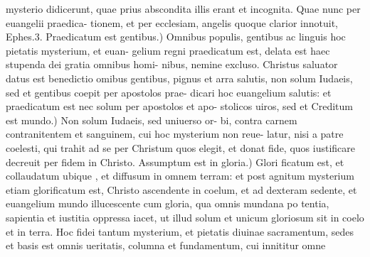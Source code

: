 \documentclass{article}
\begin{document}
\begin{pages}
mysterio didicerunt, quae prius abscondita illis erant et incognita. Quae nunc per euangelii praedica- tionem, et per ecclesiam, angelis quoque clarior innotuit, Ephes.3. Praedicatum est gentibus.) Omnibus populis, gentibus ac linguis hoc pietatis mysterium, et euan- gelium regni praedicatum est, delata est haec stupenda dei gratia omnibus homi- nibus, nemine excluso. Christus saluator datus est benedictio omibus gentibus, pignus et arra salutis, non solum Iudaeis, sed et gentibus coepit per apostolos prae- dicari hoc euangelium salutis: et praedicatum est nec solum per apostolos et apo- stolicos uiros, sed et Creditum est mundo.) Non solum Iudaeis, sed uniuerso or- bi, contra carnem contranitentem et sanguinem, cui hoc mysterium non reue- latur, nisi a patre coelesti, qui trahit ad se per Christum quos elegit, et donat fide, quos iustificare decreuit per fidem in Christo. Assumptum est in gloria.) Glori ficatum est, et collaudatum ubique , et diffusum in omnem terram: et post agnitum mysterium etiam glorificatum est, Christo ascendente in coelum, et ad dexteram sedente, et euangelium mundo illucescente cum gloria, qua omnis mundana po tentia, sapientia et iustitia oppressa iacet, ut illud solum et unicum gloriosum sit in coelo et in terra. Hoc fidei tantum mysterium, et pietatis diuinae sacramentum, sedes et basis est omnis ueritatis, columna et fundamentum, cui innititur omne  \pend

\end{pages}
\end{document}
